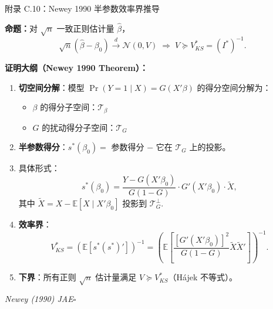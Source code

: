 \documentclass[aspectratio=169, 10pt]{beamer}
\begin{document}
\begin{frame}{附录 C.10：Newey 1990 半参数效率界推导}
  \hypertarget{proof-c10}{}

  \textbf{命题：}对 $\sqrt{n}$ 一致正则估计量 $\hat\beta$，
  $$\sqrt{n}(\hat\beta - \beta_0) \overset{d}{\to} \mathcal{N}(0, V) \;\Rightarrow\; V \succeq V^{*}_{KS} = (I^{*})^{-1}.$$

  \textbf{证明大纲（Newey 1990 Theorem）：}
  \begin{enumerate}\setlength{\itemsep}{1pt}
    \item \textbf{切空间分解}：模型 $\Pr(Y=1\mid X) = G(X'\beta)$ 的得分空间分解为：
    \begin{itemize}\setlength{\itemsep}{1pt}
      \item $\beta$ 的得分子空间：$\mathcal{T}_\beta$
      \item $G$ 的扰动得分子空间：$\mathcal{T}_G$
    \end{itemize}

    \item \textbf{半参数得分}：$s^{*}(\beta_0) = $ 参数得分 $-$ 它在 $\mathcal{T}_G$ 上的投影。

    \item 具体形式：
    $$s^{*}(\beta_0) = \frac{Y - G(X'\beta_0)}{G(1-G)} \cdot G'(X'\beta_0) \cdot \tilde X,$$
    其中 $\tilde X = X - \mathbb{E}[X \mid X'\beta_0]$ 投影到 $\mathcal{T}_G^{\perp}$.

    \item \textbf{效率界}：
    $$V^{*}_{KS} = (\mathbb{E}[s^{*} (s^{*})'])^{-1}
    = \left(\mathbb{E}\!\left[\frac{[G'(X'\beta_0)]^2}{G(1-G)} \tilde X \tilde X'\right]\right)^{-1}.$$

    \item \textbf{下界}：所有正则 $\sqrt{n}$ 估计量满足 $V \succeq V^{*}_{KS}$（Hájek 不等式）。
  \end{enumerate}

  \hfill{\scriptsize\textit{Newey (1990) JAE}}\quad$\square$
  \hfill{\scriptsize\hyperlink{main-c10}{}}

\end{frame}
\end{document}

